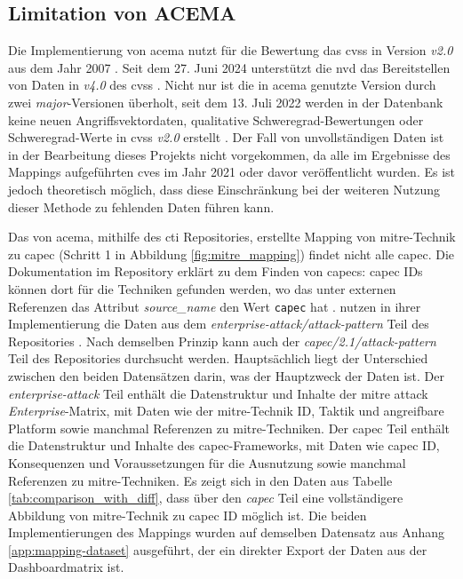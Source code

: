 \subsection{Limitation von ACEMA}
\label{limitationen-acema}
Die Implementierung von \gls{acema} nutzt für die Bewertung das \gls{cvss} in Version \textit{v2.0} aus dem Jahr 2007 \autocite{Acema_oranOCloud_Data_GatheringpyMaster}. Seit dem 27. Juni 2024 unterstützt die \gls{nvd} das Bereitstellen von Daten in \textit{v4.0} des \gls{cvss} \autocite{NVDCVSSV40}. Nicht nur ist die in \gls{acema} genutzte Version durch zwei \textit{major}-Versionen überholt, seit dem 13. Juli 2022 werden in der Datenbank keine neuen Angriffsvektordaten, qualitative Schweregrad-Bewertungen oder Schweregrad-Werte in \gls{cvss} \textit{v2.0} erstellt \autocite{RetirementCVSSV2}. Der Fall von unvollständigen Daten ist in der Bearbeitung dieses Projekts nicht vorgekommen, da alle im Ergebnisse des Mappings aufgeführten \glspl{cve} im Jahr 2021 oder davor veröffentlicht wurden. Es ist jedoch theoretisch möglich, dass diese Einschränkung bei der weiteren Nutzung dieser Methode zu fehlenden Daten führen kann.
%
\par Das von \gls{acema}, mithilfe des \gls{cti} Repositories, erstellte Mapping von \gls{mitre}-Technik zu \gls{capec} (Schritt 1 in Abbildung \ref{fig:mitre_mapping}) findet nicht alle \gls{capec}. Die Dokumentation im Repository erklärt zu dem Finden von \glspl{capec}: \gls{capec} IDs können dort für die Techniken gefunden werden, wo das unter externen Referenzen das Attribut \textit{source\_name} den Wert \verb|capec| hat \autocite{CtiUSAGEmdMaster} \autocite{CtiUSAGECAPECmdMaster}. \citeauthor{klementSecuring6GTransition2024} nutzen in ihrer Implementierung die Daten aus dem \textit{enterprise-attack/attack-pattern} Teil des Repositories \autocite{klement2023acema}. Nach demselben Prinzip kann auch der \textit{capec/2.1/attack-pattern} Teil des Repositories durchsucht werden. Hauptsächlich liegt der Unterschied zwischen den beiden Datensätzen darin, was der Hauptzweck der Daten ist. Der \textit{enterprise-attack} Teil enthält die Datenstruktur und Inhalte der \gls{mitre} \gls{attack} \textit{Enterprise}-Matrix, mit Daten wie der \gls{mitre}-Technik ID, Taktik und angreifbare Platform sowie manchmal Referenzen zu \gls{mitre}-Techniken. Der \gls{capec} Teil enthält die Datenstruktur und Inhalte des \gls{capec}-Frameworks, mit Daten wie \gls{capec} ID, Konsequenzen und Voraussetzungen für die Ausnutzung sowie manchmal Referenzen zu \gls{mitre}-Techniken. Es zeigt sich in den Daten aus Tabelle \ref{tab:comparison_with_diff}, dass über den \textit{\gls{capec}} Teil eine vollständigere Abbildung von \gls{mitre}-Technik zu \gls{capec} ID möglich ist. Die beiden Implementierungen des Mappings wurden auf demselben Datensatz aus Anhang \ref{app:mapping-dataset} ausgeführt, der ein direkter Export der Daten aus der Dashboardmatrix ist.
%

